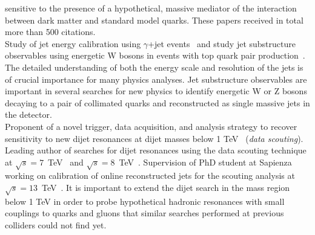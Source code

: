 \documentclass[10pt, a4paper]{article}
\newcommand{\years}[1]{\marginnote{\hskip-0.2in{\scriptsize #1}}}
\begin{document}
sensitive to the presence of a hypothetical, massive  mediator of the interaction between dark matter and
standard model quarks. These papers received in total more than 500 citations.\\ [1em] 
\years{01/2015 - 09/2018}Study of jet energy calibration using $\gamma$+jet events~\cite{AN-16-344} and
study jet substructure observables using energetic W bosons in events with
top quark pair production~\cite{AN-17-051}. The detailed understanding of both 
the energy scale and resolution of the jets is of crucial importance
for many physics analyses. Jet substructure observables are important 
in several searches for new physics to identify energetic W or Z bosons decaying to 
a pair of collimated quarks and reconstructed as single massive jets
in the detector. \\ [1em] 
\years{09/2011 - 09/2018}
Proponent of a novel trigger, data acquisition, and analysis
strategy to recover sensitivity to new dijet resonances at dijet
masses below 1 TeV~\cite{CMS-DP-2012-022} ({\it data scouting}).
Leading author of searches for dijet resonances using the data
scouting technique at $\sqrt{s}=7$~TeV~\cite{CMS-PAS-EXO-11-094} 
and $\sqrt{s}=8$~TeV~\cite{Khachatryan:2016ecr,AN-14-104}. Supervision
of PhD student at Sapienza working on calibration of online
reconstructed jets for the scouting analysis
at~$\sqrt{s}=13$~TeV~\cite{Sirunyan:2016iap,AN-16-202}. 
It is important to extend the dijet search in the mass region below 1 TeV 
in order to probe hypothetical hadronic resonances with small
couplings to quarks and gluons that similar searches performed at
previous colliders could not find yet. \\ [1em] 
\end{document}
